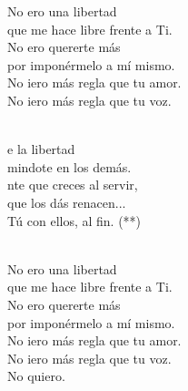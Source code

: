 \begin{cancion}
\begin{chorus}
	No ero una libertad \\
que me hace libre frente a Ti.\\
	No ero quererte más\\
por imponérmelo a mí mismo.\\
	No iero más regla que tu amor.\\
	No iero más regla que tu voz.\\
	\end{chorus}%
	\jump\\
	e la libertad\\
	mindote en los demás.\\
	nte que creces al servir,\\
	que los dás renacen... \\
Tú con ellos, al fin. (**)\\\jump\\
	\begin{chorus}%
	No ero una libertad \\
que me hace libre frente a Ti.\\
	No ero quererte más\\
por imponérmelo a mí mismo.\\
	No iero más regla que tu amor.\\
	No iero más regla que tu voz.\\
	No quiero.\\
	\end{chorus}%
	\jump\\
\end{cancion}%
